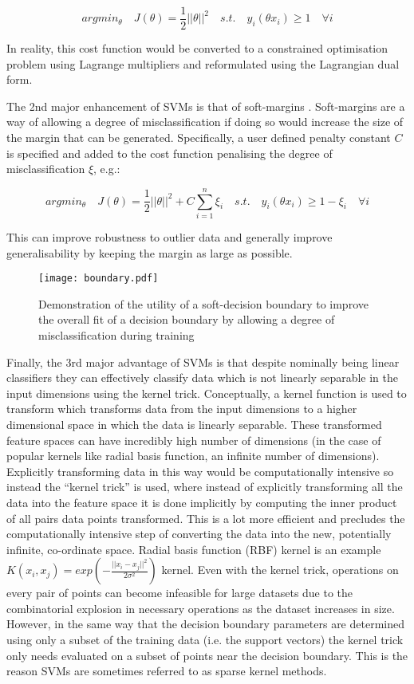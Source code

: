 \[argmin_{\theta} \quad J(\theta) = \frac{1}{2} ||\theta||^{2} \quad s.t. \quad y_{i}(\theta x_{i}) \geq 1 \quad \forall i\]

In reality, this cost function would be converted to a constrained optimisation problem using Lagrange multipliers and reformulated using the Lagrangian dual form. 


The 2nd major enhancement of SVMs is that of soft-margins \citep{Cortes1995}. Soft-margins are a way of allowing a degree of misclassification
if doing so would increase the size of the margin that can be generated.  Specifically, a user defined penalty constant \(C\) is specified and 
added to the cost function penalising the degree of misclassification \(\xi\), e.g.:

\[argmin_{\theta} \quad J(\theta) = \frac{1}{2} ||\theta||^{2}  + C \sum^{n}_{i=1} \xi_{i} \quad s.t. \quad y_{i}(\theta x_{i}) \geq 1 - \xi_{i} \quad \forall i\]

This can improve robustness to outlier data and generally improve generalisability by keeping the margin as large as possible.

\begin{figure}[h]
    \centering
    \texttt{[image: boundary.pdf]}
    \caption[Soft-margin classifiers]{Demonstration of the utility of a soft-decision boundary to improve the overall
    fit of a decision boundary by allowing a degree of misclassification during training}
    \label{fig:boundary}
\end{figure}

Finally, the 3rd major advantage of SVMs is that despite nominally being linear classifiers they can effectively classify data which 
is not linearly separable in the input dimensions using the kernel trick.  Conceptually, a kernel function is used to transform
which transforms data from the input dimensions to a higher dimensional space in which the data is linearly separable.
These transformed feature spaces can have incredibly high number of dimensions (in the case of popular kernels like radial basis
function, an infinite number of dimensions).  Explicitly transforming data in this way would be computationally intensive
so instead the ``kernel trick'' is used, where instead of explicitly transforming all the data into the feature space
it is done implicitly by computing the inner product of all pairs data points transformed.  This is a lot more efficient
and precludes the computationally intensive step of converting the data into the new, potentially infinite, co-ordinate space.
Radial basis function (RBF) kernel is an example \(K(x_{i}, x_{j}) = exp ( - \frac{||x_{i} - x_{j}||^{2}}{2\sigma^{2}})\) kernel.
Even with the kernel trick, operations on every pair of points can become infeasible for large datasets due to the combinatorial
explosion in necessary operations as the dataset increases in size.  However, in the same way that the decision boundary parameters 
are determined using only a subset of the training data (i.e. the support vectors) the kernel trick only needs
evaluated on a subset of points near the decision boundary.  This is the reason SVMs are sometimes
referred to as sparse kernel methods.

